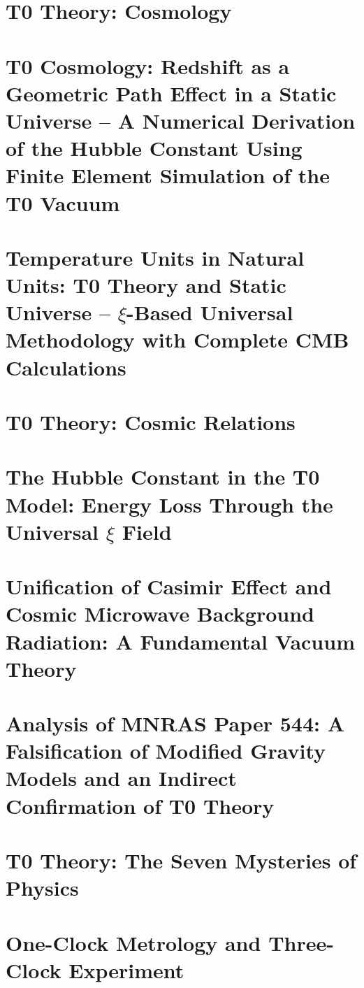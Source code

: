 	
	\chapter{T0 Theory: Cosmology}
	
	\chapter{T0 Cosmology: Redshift as a Geometric Path Effect in a Static Universe – A Numerical Derivation of the Hubble Constant Using Finite Element Simulation of the T0 Vacuum}
	
	\chapter{Temperature Units in Natural Units: T0 Theory and Static Universe – $\xi$-Based Universal Methodology with Complete CMB Calculations}
	
	\chapter{T0 Theory: Cosmic Relations}
	
	\chapter{The Hubble Constant in the T0 Model: Energy Loss Through the Universal $\xi$ Field}
	
	\chapter{Unification of Casimir Effect and Cosmic Microwave Background Radiation: A Fundamental Vacuum Theory}
	
	\chapter{Analysis of MNRAS Paper 544: A Falsification of Modified Gravity Models and an Indirect Confirmation of T0 Theory}
	
	\chapter{T0 Theory: The Seven Mysteries of Physics}
	
	\chapter{One-Clock Metrology and Three-Clock Experiment}
	
